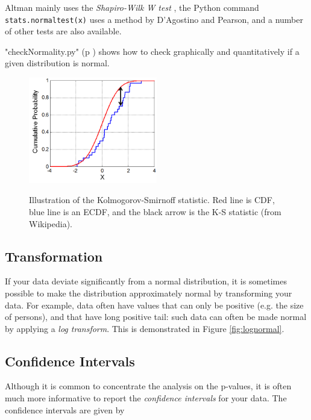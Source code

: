 Altman mainly uses the \emph{Shapiro-Wilk W test} \cite{altman99}, the Python command \lstinline{stats.normaltest(x)} uses a method by D'Agostino and Pearson,  and a number of other tests are also available.

\PyImg "checkNormality.py" (p \pageref{py:checkNormality}) shows how to check graphically and quantitatively if a given distribution is normal.

\begin{figure}
  \centering
  \includegraphics[width=0.5\textwidth]{../Images/KS_Example.png}\\
  \caption{Illustration of the Kolmogorov-Smirnoff statistic. Red line is CDF, blue line is an ECDF, and the black arrow is the K-S statistic (from Wikipedia).}\label{fig:ksplot}
\end{figure}


\subsection{Transformation} 
If your data deviate significantly from a normal distribution, it is sometimes possible to make the distribution approximately normal by transforming your data. For example, data often have values that can only be positive (e.g. the size of persons), and that have  long positive tail: such data can often be made normal by applying a \emph{log transform}. This is demonstrated in Figure \ref{fig:lognormal}.

\subsection{Confidence Intervals}
Although it is common to concentrate the analysis on the p-values, it is often much more informative to report the \emph{confidence intervals} for your data. The confidence intervals are given by

